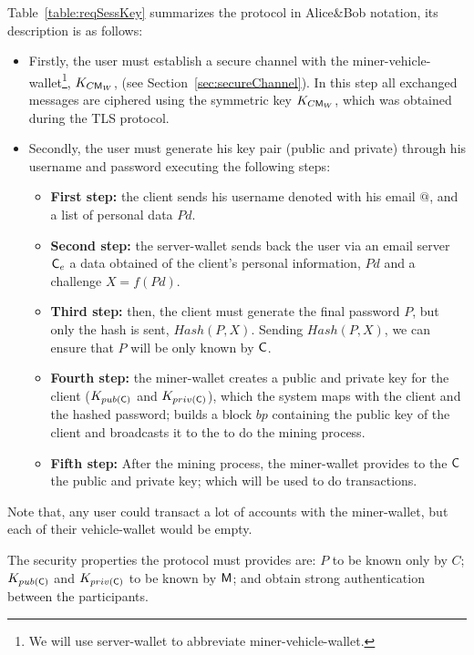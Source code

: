 Table~\ref{table:reqSessKey} summarizes the protocol
in Alice\&Bob notation, its description is as follows: 
\begin{itemize}
  \item Firstly, the user must establish a secure channel with the miner-vehicle-wallet\footnote{
    We will use server-wallet to abbreviate miner-vehicle-wallet.},
    $K_{C\textsf{M}_{W}}$,
    (see Section~\ref{sec:secureChannel}). In this step all exchanged messages are ciphered 
    using the symmetric key $K_{C\textsf{M}_{W}}$, which was obtained during the TLS protocol. 
  \item Secondly, the user must generate his key pair (public and private) through
    his username and password executing the following steps:
    \begin{itemize}
    \item \textbf{First step:} the client sends his username denoted with his email $@$, and  
        a list of personal data $Pd$. 
    \item \textbf{Second step:} the server-wallet sends back the user via an email server $\textsf{C}_e$ a 
        data obtained of the client's personal information, $Pd$ and a challenge $X=f(Pd)$. 
    \item \textbf{Third step:} then, the client must generate the final password $P$, but
      only the hash is sent, $Hash(P,X)$.  Sending $Hash(P,X)$, we can
      ensure that $P$ will be only known by $\textsf{C}$.
    \item \textbf{Fourth step:} the miner-wallet creates a public and private key for the client 
        ($K_{pub(\textsf{C})}$ and $K_{priv(\textsf{C})}$), which the system maps with the client and 
        the hashed password; builds a block $bp$ containing the public key of the client and broadcasts
        it to the \blockchaincarnetwork to do the mining process. 
    \item \textbf{Fifth step:} After the mining process, the miner-wallet provides to the $\textsf{C}$ the 
        public and private key; which will be used to do transactions. 
    \end{itemize}
\end{itemize}
Note that, any user could transact a lot of accounts with the miner-wallet, but each of their 
vehicle-wallet would be empty.




The security properties the protocol must provides are: $P$ to be
known only by $C$; $K_{pub(\textsf{C})}$ and $K_{priv(\textsf{C})}$ to be known by $\textsf{M}$; 
and obtain strong authentication between the participants.

